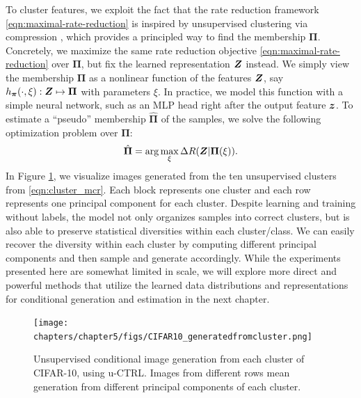 \documentclass[../../book-main.tex]{subfiles}
\begin{document}
To cluster features, we exploit the fact that the rate reduction framework \eqref{eqn:maximal-rate-reduction} is inspired by unsupervised clustering via compression \cite{ma2007segmentation}, which provides a principled way to find the membership $\bm \Pi$.
Concretely, we maximize the same rate reduction objective \eqref{eqn:maximal-rate-reduction} over $\bm \Pi$, but fix the learned representation $\bm{Z}$ instead. We simply view the membership $\bm \Pi$ as a nonlinear function of the features $\bm{Z}$, say $h_{\bm \pi}(\cdot,\xi):\bm{Z} \mapsto \bm \Pi$ with parameters $\xi$. In practice, we model this function with a simple neural network, such as an MLP head right after the output feature $\bm{z}$. 
To estimate a ``pseudo'' membership $\hat{\bm \Pi}$ of the samples, we solve the following optimization problem over $\bm \Pi$:
\begin{align}
    \hat{\bm \Pi} = \arg\max_{\xi} \Delta R(\bm{Z}| \bm \Pi(\xi)).
\label{eqn:cluster_mcr}
\end{align}
In Figure \ref{fig:vis_clustering}, we  visualize images generated from the ten unsupervised clusters from \eqref{eqn:cluster_mcr}. Each block represents one cluster and each row represents one principal component for each cluster. Despite learning and training without labels, the model not only organizes samples into correct clusters, but is also able to preserve statistical diversities within each cluster/class. We can easily recover the diversity within each cluster by computing different principal components and then sample and generate accordingly. While the experiments presented here are somewhat limited in scale, we will explore more direct and powerful methods that utilize the learned data distributions and representations for conditional generation and estimation in the next chapter.
\begin{figure}[t]
    \footnotesize
    \centering
    \texttt{[image: chapters/chapter5/figs/CIFAR10\_generatedfromcluster.png]}
    \caption{\small Unsupervised conditional image generation from each cluster of CIFAR-10, using u-CTRL. Images from different rows mean generation from different principal components of each cluster.}
    \label{fig:vis_clustering}
\end{figure}




\end{document}
